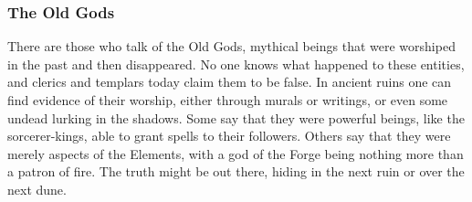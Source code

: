 \subsubsection{The Old Gods}
There are those who talk of the Old Gods, mythical beings that were worshiped in the past and then disappeared. No one knows what happened to these entities, and clerics and templars today claim them to be false. In ancient ruins one can find evidence of their worship, either through murals or writings, or even some undead lurking in the shadows. Some say that they were powerful beings, like the sorcerer-kings, able to grant spells to their followers. Others say that they were merely aspects of the Elements, with a god of the Forge being nothing more than a patron of fire. The truth might be out there, hiding in the next ruin or over the next dune.